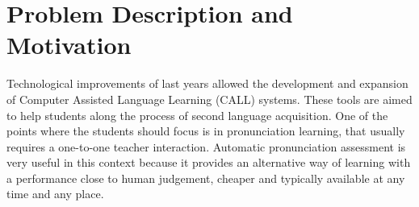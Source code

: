 
\section{Problem Description and Motivation} \label{section:motivation}

Technological improvements of last years allowed the development and expansion of Computer
Assisted Language Learning (CALL) systems. These tools are aimed to help students along the
process of second language acquisition. One of the points where the
students should focus is in pronunciation learning, that usually requires a one-to-one teacher
interaction. Automatic pronunciation assessment is very useful in this
context because it provides an alternative way of learning with a performance close to human judgement,
cheaper and typically available at any time and any place.




